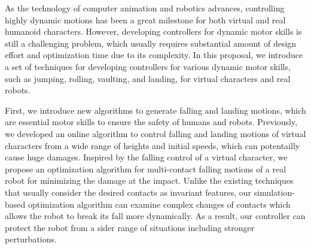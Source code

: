 \begin{summary}
  As the technology of computer animation and robotics advances,
  controlling highly dynamic motions
  has been a great milestone for both virtual and real humanoid characters.
  However, developing controllers for dynamic motor skills is still 
  a challenging problem, which usually requires substantial amount of 
  design effort and optimization time due to its complexity.
  In this proposal, we introduce a set of techniques for developing
  controllers for various dynamic motor skills, such as jumping, rolling, 
  vaulting, and landing, for virtual characters and real robots.

  First, we introduce new algorithms to generate falling and landing motions,
  which are essential motor skills to ensure the safety of humans and robots.
  Previously, we  developed an online algorithm to control falling and 
  landing motions of virtual characters from a wide range of heights 
  and initial speeds, which can potentailly cause huge damages.
  Inspired by the falling control of a virtual character, 
  we propose an optimization algorithm for multi-contact falling
  motions of a real robot for minimizing the damage at the impact.
  Unlike the existing techniques that usually consider the desired contacts 
  as invariant features, 
  our simulation-based optimization algorithm can examine complex changes
  of contacts which allows the robot to break its fall more dynamically.
  As a result, our controller can protect the robot from a sider
  range of situations including stronger perturbations.




\end{summary}
